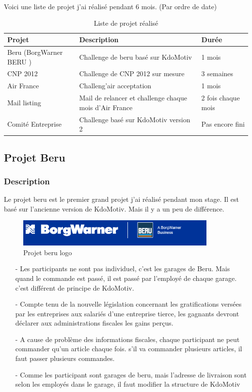 Voici une liste de projet j'ai réalisé pendant 6 mois. (Par ordre de date)

\begin{table}[htbp]
\centering
\renewcommand{\tabularxcolumn}[1]{>{\arraybackslash}m{#1}}
\begin{tabularx}{\textwidth}{lXl}
  \toprule
  Projet & Description  & Durée  \\
  \midrule
	 Beru (BorgWarner BERU )& Challenge de beru basé sur KdoMotiv & 1 mois \\ 	 
	 \hline	 
	 CNP 2012 & Challenge de CNP 2012 sur mesure & 3 semaines \\ 	 
	 \hline
	 Air France & Challeng'air acceptation & 1 mois \\ 
	 \hline
	 Mail listing & Mail de relancer et challenge chaque mois d'Air France & 2 fois chaque mois\\
	 \hline
	 Comité Entreprise & Challenge basé sur KdoMotiv version 2 & Pas encore fini \\
  \bottomrule
\end{tabularx}
 \caption{Liste de projet réalisé }
\end{table}

\subsection{Projet Beru}

\subsubsection{Description}
Le projet beru est le premier grand projet j'ai réalisé pendant mon stage. Il est basé sur l'ancienne version de KdoMotiv. Mais il y a un peu de différence.

\begin{figure}[hbtp]
\centering
\includegraphics[width=10cm]{body/images/projet-beru.png}
\caption{Projet beru logo}
\end{figure}

\begin{itemize}
\item [-] Les participants ne sont pas individuel, c'est les garages de Beru. Mais quand le commande est passé, il est passé par l'employé de chaque garage. c'est différent de principe de KdoMotiv.
\item [-] Compte tenu de la nouvelle législation concernant les gratifications versées par les entreprises aux salariés d'une entreprise tierce, les gagnants devront déclarer aux administrations fiscales les gains perçus. 
\item [-] A cause de problème des informations fiscales, chaque participant ne peut commander qu'un article chaque fois. s'il va commander plusieurs articles, il faut passer plusieurs commandes.
\item [-] Comme les participant sont garages de beru, mais l'adresse de livraison sont selon les employés dans le garage, il faut modifier la structure de KdoMotiv 
\end{itemize}

